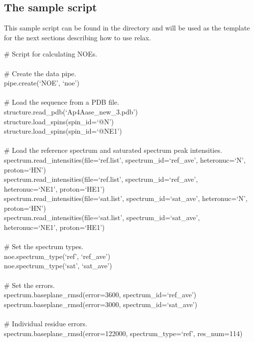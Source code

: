 \subsection{The sample script}

This sample script can be found in the  directory and will be used as the template for the next sections describing how to use relax.

\begin{exampleenv}
\# Script for calculating NOEs. \\
 \\
\# Create the data pipe. \\
pipe.create(`NOE', `noe') \\
 \\
\# Load the sequence from a PDB file. \\
structure.read\_pdb(`Ap4Aase\_new\_3.pdb') \\
structure.load\_spins(spin\_id=`@N') \\
structure.load\_spins(spin\_id=`@NE1') \\
 \\
\# Load the reference spectrum and saturated spectrum peak intensities. \\
spectrum.read\_intensities(file=`ref.list', spectrum\_id=`ref\_ave', heteronuc=`N', proton=`HN') \\
spectrum.read\_intensities(file=`ref.list', spectrum\_id=`ref\_ave', heteronuc=`NE1', proton=`HE1') \\
spectrum.read\_intensities(file=`sat.list', spectrum\_id=`sat\_ave', heteronuc=`N', proton=`HN') \\
spectrum.read\_intensities(file=`sat.list', spectrum\_id=`sat\_ave', heteronuc=`NE1', proton=`HE1') \\
 \\
\# Set the spectrum types. \\
noe.spectrum\_type(`ref', `ref\_ave') \\
noe.spectrum\_type(`sat', `sat\_ave') \\
 \\
\# Set the errors. \\
spectrum.baseplane\_rmsd(error=3600, spectrum\_id=`ref\_ave') \\
spectrum.baseplane\_rmsd(error=3000, spectrum\_id=`sat\_ave') \\
 \\
\# Individual residue errors. \\
spectrum.baseplane\_rmsd(error=122000, spectrum\_type=`ref', res\_num=114) \\

\end{exampleenv}
